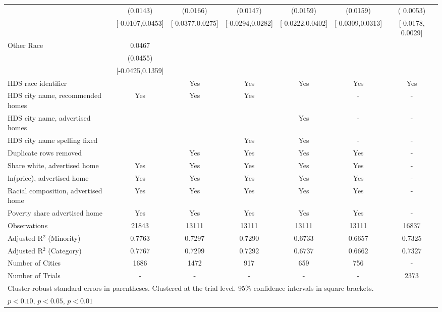 \begin{table}[htbp]
{\begin{tabular}{l*{6}{c}}
 & (0.0143) & (0.0166) & (0.0147) & (0.0159) & (0.0159) & ( 0.0053) \\
 & [-0.0107,0.0453] & [-0.0377,0.0275] & [-0.0294,0.0282] & [-0.0222,0.0402] & [-0.0309,0.0313] & [-0.0178,  0.0029] \\
Other Race & 0.0467 &  &  &  &  &  \\
 & (0.0455) &  &  &  &  &  \\
 & [-0.0425,0.1359] &  &  &  &  &  \\
\midrule
HDS race identifier & & Yes & Yes & Yes & Yes & Yes \\
HDS city name, recommended homes & Yes & Yes & Yes & & - & -\\
HDS city name, advertised homes &  &  &  & Yes & - & -\\
HDS city name spelling fixed & & & Yes & Yes & - & -\\
Duplicate rows removed &  & Yes & Yes & Yes & Yes & - \\
\midrule
Share white, advertised home  & Yes & Yes & Yes & Yes & Yes & - \\
ln(price), advertised home  & Yes & Yes & Yes & Yes & Yes & - \\
Racial composition, advertised home & Yes & Yes & Yes & Yes & Yes & - \\
Poverty share advertised home & Yes & Yes & Yes & Yes & Yes & - \\
Observations & 21843 & 13111 & 13111 & 13111 & 13111 & 16837 \\
Adjusted R$^2$ (Minority) & 0.7763 & 0.7297 & 0.7290 & 0.6733 & 0.6657 & 0.7325 \\
Adjusted R$^2$ (Category) & 0.7767 & 0.7299 & 0.7292 & 0.6737 & 0.6662 & 0.7327 \\
Number of Cities & 1686 & 1472 & 917 & 659 & 756 & - \\
Number of Trials & - & - & - & - & - & 2373 \\
\bottomrule
\multicolumn{7}{l}{\footnotesize Cluster-robust standard errors in parentheses. Clustered at the trial level. 95\% confidence intervals in square brackets.}\\
\multicolumn{7}{l}{\footnotesize \sym{*} \(p<0.10\), \sym{**} \(p<0.05\), \sym{***} \(p<0.01\)}\\
\end{tabular}
}
\end{table}
